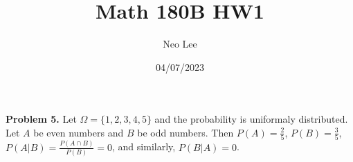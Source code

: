 \documentclass{article}
\title{Math 180B HW1}
\author{Neo Lee}
\date{04/07/2023}
\begin{document}
 

\maketitle 
\textbf{Problem 5.}
Let $\Omega = \{1, 2, 3, 4, 5\}$ and the probability is uniformaly distributed. Let $A$ be even numbers and $B$ be odd numbers.
Then $P(A) = \frac{2}{5}$, $P(B) = \frac{3}{5}$, $P(A|B) = \frac{P(A\cap B)}{P(B)} = 0$, and similarly, $P(B|A) = 0$.
\end{document}
